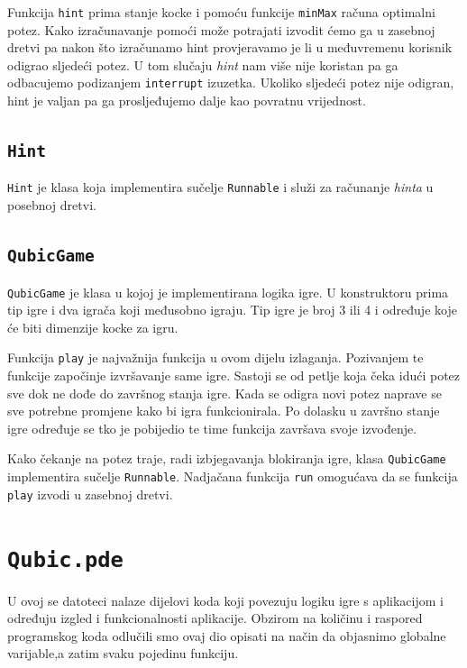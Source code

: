 \documentclass[12pt]{scrartcl}
\begin{document}
Funkcija \texttt{hint} prima stanje kocke i pomoću funkcije \texttt{minMax} računa optimalni potez. Kako izračunavanje pomoći može potrajati izvodit ćemo ga u zasebnoj dretvi pa nakon što izračunamo hint provjeravamo je li u međuvremenu korisnik odigrao sljedeći potez. U tom slučaju \emph{hint} nam više nije koristan pa ga odbacujemo podizanjem \texttt{interrupt} izuzetka. Ukoliko sljedeći potez nije odigran, hint je valjan pa ga prosljeđujemo dalje kao povratnu vrijednost.

\subsection{\texttt{Hint}}
\texttt{Hint} je klasa koja implementira sučelje \texttt{Runnable} i služi za računanje \emph{hinta} u posebnoj dretvi.

\subsection{\texttt{QubicGame}}
\texttt{QubicGame} je klasa u kojoj je implementirana logika igre. U konstruktoru prima tip igre i dva igrača koji međusobno igraju. Tip igre je broj 3 ili 4 i određuje koje će biti dimenzije kocke za igru. 

Funkcija \texttt{play} je najvažnija funkcija u ovom dijelu izlaganja. Pozivanjem te funkcije započinje izvršavanje same igre. Sastoji se od petlje koja čeka idući potez sve dok ne dođe do završnog stanja igre. Kada se odigra novi potez naprave se sve potrebne promjene kako bi igra funkcionirala. Po dolasku u završno stanje igre određuje se tko je pobijedio te time funkcija završava svoje izvođenje.

Kako čekanje na potez traje, radi izbjegavanja blokiranja igre, klasa \texttt{QubicGame} implementira sučelje \texttt{Runnable}. Nadjačana funkcija \texttt{run} omogućava da se funkcija \texttt{play} izvodi u zasebnoj dretvi.

\section{\texttt{Qubic.pde}}
U ovoj se datoteci nalaze dijelovi koda koji povezuju logiku igre s aplikacijom i određuju izgled i funkcionalnosti aplikacije. 
Obzirom na količinu i raspored programskog koda odlučili smo ovaj dio opisati na način da objasnimo globalne varijable,a zatim svaku pojedinu funkciju. 
\end{document}
